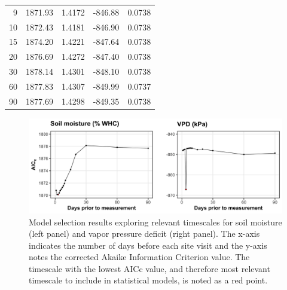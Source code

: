 \begin{table}
\begin{tabular}{p{0.75cm}p{1.5cm}p{1.5cm}p{1.5cm}p{1.5cm}}
            \multicolumn{1}{r}{9}  & \multicolumn{1}{r}{1871.93}            & \multicolumn{1}{r}{1.4172}            & \multicolumn{1}{r}{-846.88}           & \multicolumn{1}{r}{0.0738} \\
            \multicolumn{1}{r}{10} & \multicolumn{1}{r}{1872.43}            & \multicolumn{1}{r}{1.4181}            & \multicolumn{1}{r}{-846.90}           & \multicolumn{1}{r}{0.0738} \\
            \multicolumn{1}{r}{15} & \multicolumn{1}{r}{1874.20}            & \multicolumn{1}{r}{1.4221}            & \multicolumn{1}{r}{-847.64}           & \multicolumn{1}{r}{0.0738} \\
            \multicolumn{1}{r}{20} & \multicolumn{1}{r}{1876.69}            & \multicolumn{1}{r}{1.4272}            & \multicolumn{1}{r}{-847.40}           & \multicolumn{1}{r}{0.0738} \\
            \multicolumn{1}{r}{30} & \multicolumn{1}{r}{1878.14}            & \multicolumn{1}{r}{1.4301}            & \multicolumn{1}{r}{-848.10}           & \multicolumn{1}{r}{0.0738} \\
            \multicolumn{1}{r}{60} & \multicolumn{1}{r}{1877.83}            & \multicolumn{1}{r}{1.4307}            & \multicolumn{1}{r}{-849.99}           & \multicolumn{1}{r}{0.0737} \\
            \multicolumn{1}{r}{90} & \multicolumn{1}{r}{1877.69}            & \multicolumn{1}{r}{1.4298}            & \multicolumn{1}{r}{-849.35}           & \multicolumn{1}{r}{0.0738} \\
            \hline
\end{tabular}
\end{table}
\clearpage

\newpage
\begin{landscape}
    \begin{figure}
        \centering
        \includegraphics[width=\linewidth]{ch4_TXeco/figs/TXeco_figS2_aicc.jpg}
        \caption[Model selection results exploring relevant timescales for soil moisture and vapor pressure deficit]{Model selection results exploring relevant timescales for soil moisture (left panel) and vapor pressure deficit (right panel). The x-axis indicates the number of days before each site visit and the y-axis notes the corrected Akaike Information Criterion value. The timescale with the lowest AICc value, and therefore most relevant timescale to include in statistical models, is noted as a red point.}
        \label{fig:figure.c1}
    \end{figure}
\end{landscape}
\clearpage

